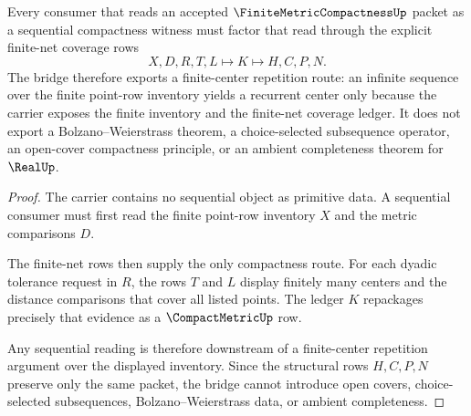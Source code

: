\begin{theorem}
\label{thm:finite-metric-compactness-net-sequential-bridge}
Every consumer that reads an accepted $\FiniteMetricCompactnessUp$ packet as a sequential compactness witness must factor that read through the explicit finite-net coverage rows
$$
X,D,R,T,L \longmapsto K \longmapsto H,C,P,N .
$$
The bridge therefore exports a finite-center repetition route: an infinite sequence over the finite point-row inventory yields a recurrent center only because the carrier exposes the finite inventory and the finite-net coverage ledger. It does not export a Bolzano--Weierstrass theorem, a choice-selected subsequence operator, an open-cover compactness principle, or an ambient completeness theorem for $\RealUp$.
\end{theorem}
\begin{proof}
The carrier contains no sequential object as primitive data. A sequential consumer must first read the finite point-row inventory $X$ and the metric comparisons $D$.

The finite-net rows then supply the only compactness route. For each dyadic tolerance request in $R$, the rows $T$ and $L$ display finitely many centers and the distance comparisons that cover all listed points. The ledger $K$ repackages precisely that evidence as a $\CompactMetricUp$ row.

Any sequential reading is therefore downstream of a finite-center repetition argument over the displayed inventory. Since the structural rows $H,C,P,N$ preserve only the same packet, the bridge cannot introduce open covers, choice-selected subsequences, Bolzano--Weierstrass data, or ambient completeness.
\end{proof}




